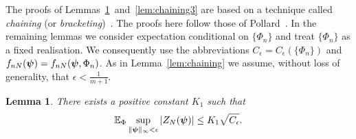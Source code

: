 \documentclass[aap,preprint]{imsart}
\newcommand{\expect}{{\mathbb E}}
\newcommand{\abs}[1]{\left\vert #1 \right\vert}
\newtheorem{lemma}{Lemma}
\begin{document}
The proofs of Lemmas~\ref{lem:chaining2}~and~\ref{lem:chaining3} are based on a technique called \emph{chaining} (or \emph{bracketing})~\cite{Dudley_unif_central_lim_th_1999,Ossiander_clt_bracketing_1984,Pollard_asymp_empi_proc_1989,Pollard_new_ways_clts_1986,van2009empirical}.  The proofs here follow those of Pollard~\cite{Pollard_asymp_empi_proc_1989}.  In the remaining lemmas we consider expectation conditional on $\{\Phi_n\}$ and treat $\{\Phi_n\}$ as a fixed realisation. We consequently use the abbreviations $C_\epsilon = C_\epsilon(\{\Phi_n\})$ and $f_{nN}(\boldsymbol{\psi}) = f_{nN}(\boldsymbol{\psi}, \Phi_n)$.  As in Lemma~\ref{lem:chaining} we assume, without loss of generality, that $\epsilon < \tfrac{1}{m+1}$.  

\begin{lemma}\label{lem:chaining2}
There exists a positive constant $K_1$ such that
\[
\expect_\Phi \sup_{\|\psibf\|_{\infty} < \epsilon} \abs{ Z_N(\psibf) } \leq K_1 \sqrt{C_\epsilon}.
\]
\end{lemma}
\end{document}
